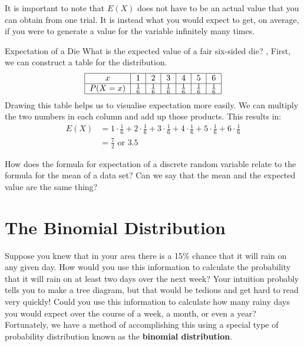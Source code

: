 \documentclass[../../main.tex]{subfiles}
\begin{document}
It is important to note that $E(X)$ does not have to be an actual value that you can obtain from one trial. It is instead what you would expect to get, on average, if you were to generate a value for the variable infinitely many times.

\begin{example}{Expectation of a Die}
What is the expected value of a fair six-sided die?
\sep
First, we can construct a table for the distribution.
\begin{align}
\begin{tabular}{ |c|c|c|c|c|c|c| } 
 \hline
 $x$ & 1 & 2 & 3 & 4 & 5 & 6 \\ 
 \hline
 $P(X=x)$ & $\frac{1}{6}$ & $\frac{1}{6}$ & $\frac{1}{6}$ & $\frac{1}{6}$ & $\frac{1}{6}$ & $\frac{1}{6}$ \\ 
 \hline
\end{tabular}
\end{align}
Drawing this table helps us to visualise expectation more easily. We can multiply the two numbers in each column and add up those products. This results in:
\begin{align}
E(X) &= 1 \cdot \frac{1}6 + 2 \cdot \frac{1}6 + 3 \cdot \frac{1}6 + 4 \cdot \frac{1}6 + 5 \cdot \frac{1}6 + 6 \cdot \frac{1}6 \\
&= \frac{7}2 \text{ or } 3.5
\end{align}
\end{example}

\begin{thinking}
How does the formula for expectation of a discrete random variable relate to the formula for the mean of a data set? Can we say that the mean and the expected value are the same thing?
\end{thinking}

\section{The Binomial Distribution}
Suppose you knew that in your area there is a 15\% chance that it will rain on any given day. How would you use this information to calculate the probability that it will rain on at least two days over the next week? Your intuition probably tells you to make a tree diagram, but that would be tedious and get hard to read very quickly! Could you use this information to calculate how many rainy days you would expect over the course of a week, a month, or even a year? Fortunately, we have a method of accomplishing this using a special type of probability distribution known as the \textbf{binomial distribution}. 
\end{document}
